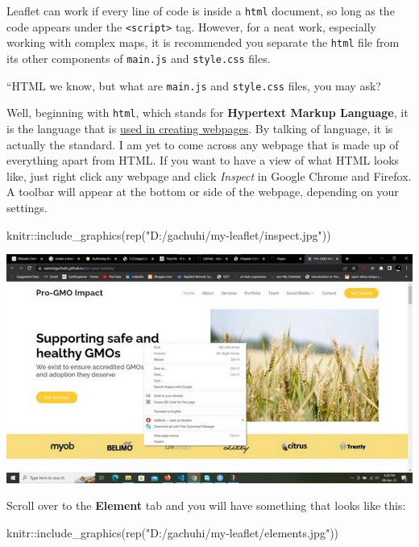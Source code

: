 \documentclass[
]{book}
\newenvironment{Shaded}{\begin{snugshade}}{\end{snugshade}}
\newcommand{\FunctionTok}[1]{\textcolor[rgb]{0.00,0.00,0.00}{#1}}
\newcommand{\NormalTok}[1]{#1}
\newcommand{\SpecialCharTok}[1]{\textcolor[rgb]{0.00,0.00,0.00}{#1}}
\newcommand{\StringTok}[1]{\textcolor[rgb]{0.31,0.60,0.02}{#1}}
\theoremstyle{definition}
\theoremstyle{definition}
\theoremstyle{definition}
\theoremstyle{definition}
\theoremstyle{remark}
\begin{document}
Leaflet can work if every line of code is inside a \texttt{html} document, so long as the code appears under the \texttt{\textless{}script\textgreater{}} tag. However, for a neat work, especially working with complex maps, it is recommended you separate the \texttt{html} file from its other components of \texttt{main.js} and \texttt{style.css} files.

``HTML we know, but what are \texttt{main.js} and \texttt{style.css} files, you may ask?

Well, beginning with \texttt{html}, which stands for \textbf{Hypertext Markup Language}, it is the language that is \href{https://www.tutorialspoint.com/html/index.htm}{used in creating webpages}. By talking of language, it is actually the standard. I am yet to come across any webpage that is made up of everything apart from HTML. If you want to have a view of what HTML looks like, just right click any webpage and click \emph{Inspect} in Google Chrome and Firefox. A toolbar will appear at the bottom or side of the webpage, depending on your settings.

\begin{Shaded}
\begin{Highlighting}[]
\NormalTok{knitr}\SpecialCharTok{::}\FunctionTok{include\_graphics}\NormalTok{(}\FunctionTok{rep}\NormalTok{(}\StringTok{"D:/gachuhi/my{-}leaflet/inspect.jpg"}\NormalTok{))}
\end{Highlighting}
\end{Shaded}

\includegraphics[width=11.11in]{../inspect}

Scroll over to the \textbf{Element} tab and you will have something that looks like this:

\begin{Shaded}
\begin{Highlighting}[]
\NormalTok{knitr}\SpecialCharTok{::}\FunctionTok{include\_graphics}\NormalTok{(}\FunctionTok{rep}\NormalTok{(}\StringTok{"D:/gachuhi/my{-}leaflet/elements.jpg"}\NormalTok{))}
\end{Highlighting}
\end{Shaded}
\end{document}
